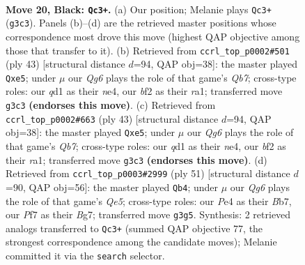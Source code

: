 \documentclass[11pt]{article}
\begin{document}
\clearpage

\begin{figure}[p]\centering
\begin{subfigure}{0.46\textwidth}\centering
\resizebox{\linewidth}{!}{%
\newchessgame
\chessboard[
  setfen={1r3rk1/p2b1pb1/2pp4/7p/P1PNp2P/6q1/5B2/R2QK2R b KQ - 1 20},
  showmover=false,
  pgfstyle=straightmove, color=movearrow, markmove={g3-c3}
]}
\caption{}
\end{subfigure}\hfill
\begin{subfigure}{0.46\textwidth}\centering
\resizebox{\linewidth}{!}{%
\newchessgame
\chessboard[
  setfen={r1b2rk1/pp3p2/6p1/3PN2P/1b2N3/8/PqB1KP2/R2Q3R b - - 1 22},
  showmover=false,
  pgfstyle=straightmove, color=movearrow, markmove={b2-e5}
]}
\caption{}
\end{subfigure}
\\[4pt]
\begin{subfigure}{0.46\textwidth}\centering
\resizebox{\linewidth}{!}{%
\newchessgame
\chessboard[
  setfen={r1b2rk1/pp3p2/6p1/3PN2P/1b2N3/8/PqB1KP2/R2Q3R b - - 1 22},
  showmover=false,
  pgfstyle=straightmove, color=movearrow, markmove={b2-e5}
]}
\caption{}
\end{subfigure}\hfill
\begin{subfigure}{0.46\textwidth}\centering
\resizebox{\linewidth}{!}{%
\newchessgame
\chessboard[
  setfen={5rk1/pb4bp/3ppp2/8/4qP2/4N3/PPR3QP/4R1K1 b - - 0 26},
  showmover=false,
  pgfstyle=straightmove, color=movearrow, markmove={e4-b4}
]}
\caption{}
\end{subfigure}
\caption{\textbf{Move 20, Black: \texttt{Qc3+}.} (a) Our position; Melanie plays \texttt{Qc3+} (\texttt{g3c3}). Panels (b)--(d) are the retrieved master positions whose correspondence most drove this move (highest QAP objective among those that transfer to it). (b) Retrieved from \texttt{ccrl\_top\_p0002\#501} (ply 43) [structural distance $d$=94, QAP obj=38]: the master played \texttt{Qxe5}; under $\mu$ our \emph{Qg6} plays the role of that game's \emph{Qb7}; cross-type roles: our \emph{q}d1 as their \emph{n}e4, our \emph{b}f2 as their \emph{r}a1; transferred move \texttt{g3c3} \textbf{(endorses this move)}. (c) Retrieved from \texttt{ccrl\_top\_p0002\#663} (ply 43) [structural distance $d$=94, QAP obj=38]: the master played \texttt{Qxe5}; under $\mu$ our \emph{Qg6} plays the role of that game's \emph{Qb7}; cross-type roles: our \emph{q}d1 as their \emph{n}e4, our \emph{b}f2 as their \emph{r}a1; transferred move \texttt{g3c3} \textbf{(endorses this move)}. (d) Retrieved from \texttt{ccrl\_top\_p0003\#2999} (ply 51) [structural distance $d$=90, QAP obj=56]: the master played \texttt{Qb4}; under $\mu$ our \emph{Qg6} plays the role of that game's \emph{Qe5}; cross-type roles: our \emph{P}e4 as their \emph{B}b7, our \emph{P}f7 as their \emph{B}g7; transferred move \texttt{g3g5}. Synthesis: 2 retrieved analogs transferred to \texttt{Qc3+} (summed QAP objective 77, the strongest correspondence among the candidate moves); Melanie committed it via the \texttt{search} selector.}
\label{fig:thought-m39}
\end{figure}
\end{document}
